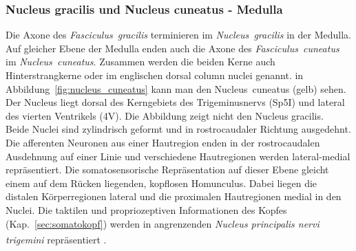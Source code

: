 \documentclass[12pt,a4paper,pdftex]{article}
\begin{document}
\subsubsection*{Nucleus gracilis und Nucleus cuneatus - Medulla}

Die Axone des \textit{Fasciculus~gracilis} terminieren im \textit{Nucleus~gracilis} in der Medulla. Auf gleicher Ebene der Medulla enden auch die Axone des \textit{Fasciculus~cuneatus} im \textit{Nucleus~cuneatus}. Zusammen werden die beiden Kerne auch Hinterstrangkerne oder im englischen dorsal column nuclei genannt. in Abbildung~\ref{fig:nucleus_cuneatus} kann man den Nucleus~cuneatus (gelb) sehen. Der Nucleus liegt dorsal des Kerngebiets des Trigeminusnervs (Sp5I) und lateral des vierten Ventrikels (4V). Die Abbildung zeigt nicht den Nucleus gracilis.
\\
\noindent
Beide Nuclei sind zylindrisch geformt und in rostrocaudaler Richtung ausgedehnt. Die afferenten Neuronen aus einer Hautregion enden in der rostrocaudalen Ausdehnung auf einer Linie und verschiedene Hautregionen werden lateral-medial repräsentiert. Die somatosensorische Repräsentation auf dieser Ebene gleicht einem auf dem Rücken liegenden, kopflosen Homunculus. Dabei liegen die distalen Körperregionen lateral und die proximalen Hautregionen medial in den Nuclei. Die taktilen und propriozeptiven Informationen des Kopfes (Kap.~\ref{sec:somatokopf}) werden in angrenzenden \textit{Nucleus principalis nervi trigemini} repräsentiert \textsuperscript{\cite[22]{kandel2013principles}}. 
\\
\end{document}
